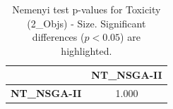 \begin{table}[h!]
\centering
\scriptsize
\begin{tabular}{lc}
\toprule
 & NT\_NSGA-II \\
\midrule
\textbf{NT\_NSGA-II} & 1.000 \\
\bottomrule
\end{tabular}
\caption{Nemenyi test p-values for Toxicity (2_Objs) - Size. Significant differences ($p < 0.05$) are highlighted.}
\label{tab:nemenyi_nemenyi_Toxicity_2_Objs_Test_Size}
\end{table}